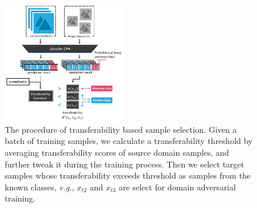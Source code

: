 \begin{figure}[!t]
    \centering 
    \includegraphics[width=0.48\textwidth]{contents/figures/pdf/selection.pdf} 
    \caption{
        The procedure of transferability based sample selection. 
        Given a batch of training samples, we calculate a transferability threshold by averaging transferability scores of source domain samples, and further tweak it during the training process.
        Then we select target samples whose transferability exceeds threshold as samples from the known classes, \textit{e.g.}, $x_{t2}$ and $x_{t3}$ are select for domain adversarial training. 
    } 
    \label{figure: selection} 
\end{figure}